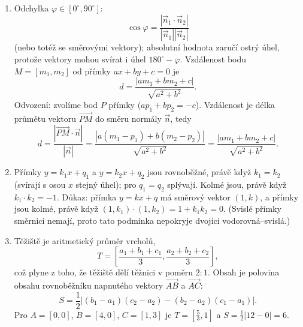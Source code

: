 \begin{enumerate}[label=\textbf{\arabic*.}, leftmargin=*, itemsep=0.8em]
  \item {}
  Odchylka $\varphi\in[0^\circ, 90^\circ]$:
  \begin{equation*}
    \cos\varphi = \frac{|\vec{n}_1\cdot\vec{n}_2|}{|\vec{n}_1||\vec{n}_2|}
  \end{equation*}
  (nebo totéž se směrovými vektory); absolutní hodnota zaručí ostrý úhel, protože vektory mohou svírat i úhel $180^\circ - \varphi$. Vzdálenost bodu $M = [m_1, m_2]$ od přímky $ax + by + c = 0$ je
  \begin{equation*}
    d = \frac{|am_1 + bm_2 + c|}{\sqrt{a^2 + b^2}}.
  \end{equation*}
  Odvození: zvolíme bod $P$ přímky ($ap_1 + bp_2 = -c$). Vzdálenost je délka průmětu vektoru $\overrightarrow{PM}$ do směru normály $\vec{n}$, tedy
  \begin{equation*}
    d = \frac{|\overrightarrow{PM}\cdot\vec{n}|}{|\vec{n}|} = \frac{|a(m_1 - p_1) + b(m_2 - p_2)|}{\sqrt{a^2 + b^2}} = \frac{|am_1 + bm_2 + c|}{\sqrt{a^2 + b^2}}.
  \end{equation*}

  \item {}
  Přímky $y = k_1x + q_1$ a $y = k_2x + q_2$ jsou rovnoběžné, právě když $k_1 = k_2$ (svírají s osou $x$ stejný úhel); pro $q_1 = q_2$ splývají. Kolmé jsou, právě když $k_1\cdot k_2 = -1$. Důkaz: přímka $y = kx + q$ má směrový vektor $(1, k)$, a přímky jsou kolmé, právě když $(1, k_1)\cdot(1, k_2) = 1 + k_1k_2 = 0$. (Svislé přímky směrnici nemají, proto tato podmínka nepokryje dvojici vodorovná--svislá.)

  \item {}
  Těžiště je aritmetický průměr vrcholů,
  \begin{equation*}
    T = \left[\frac{a_1 + b_1 + c_1}{3}, \frac{a_2 + b_2 + c_2}{3}\right],
  \end{equation*}
  což plyne z toho, že těžiště dělí těžnici v poměru $2:1$. Obsah je polovina obsahu rovnoběžníku napnutého vektory $\overrightarrow{AB}$ a $\overrightarrow{AC}$:
  \begin{equation*}
    S = \frac{1}{2}\left|(b_1 - a_1)(c_2 - a_2) - (b_2 - a_2)(c_1 - a_1)\right|.
  \end{equation*}
  Pro $A = [0, 0]$, $B = [4, 0]$, $C = [1, 3]$ je $T = \left[\frac{5}{3}, 1\right]$ a $S = \frac{1}{2}|12 - 0| = 6$. 
\end{enumerate}

